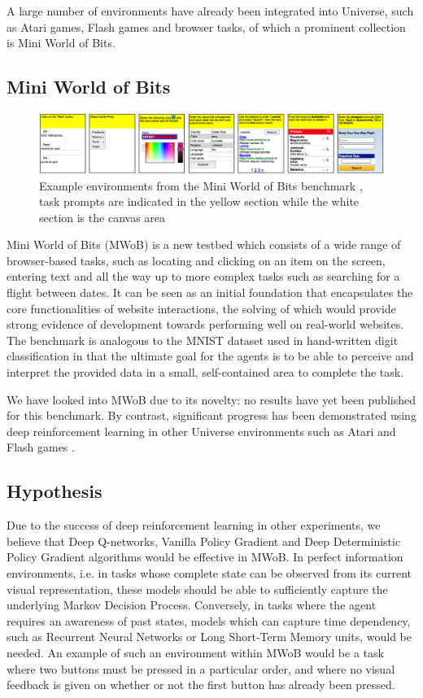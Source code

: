 \documentclass[10pt,journal,compsoc]{IEEEtran}
\begin{document}
A large number of environments have already been integrated into Universe, such as Atari games, Flash games and browser tasks, of which a prominent collection is Mini World of Bits.

\subsection{Mini World of Bits}

\begin{figure}[t]
	\includegraphics[width=\textwidth, height=\textheight, keepaspectratio]{mwob.png}
	\caption{Example environments from the Mini World of Bits benchmark \cite{mwob}, task prompts are indicated in the yellow section while the white section is the canvas area}
	\label{fig:mwob}
\end{figure}

Mini World of Bits (MWoB) \cite{mwob} is a new testbed which consists of a wide range of browser-based tasks, such as locating and clicking on an item on the screen, entering text and all the way up to more complex tasks such as searching for a flight between dates. It can be seen as an initial foundation that encapsulates the core functionalities of website interactions, the solving of which would provide strong evidence of development towards performing well on real-world websites. The benchmark is analogous to the MNIST dataset \cite{lecun1998gradient} used in hand-written digit classification in that the ultimate goal for the agents is to be able to perceive and interpret the provided data in a small, self-contained area to complete the task.

We have looked into MWoB due to its novelty: no results have yet been published for this benchmark. By contrast, significant progress has been demonstrated using deep reinforcement learning in other Universe environments such as Atari and Flash games \cite{mnih2013playing}.

\subsection{Hypothesis}
Due to the success of deep reinforcement learning in other experiments, we believe that Deep Q-networks, Vanilla Policy Gradient and Deep Deterministic Policy Gradient algorithms would be effective in MWoB. In perfect information environments, i.e. in tasks whose complete state can be observed from its current visual representation, these models should be able to sufficiently capture the underlying Markov Decision Process. Conversely, in tasks where the agent requires an awareness of past states, models which can capture time dependency, such as Recurrent Neural Networks or Long Short-Term Memory units, would be needed. An example of such an environment within MWoB would be a task where two buttons must be pressed in a particular order, and where no visual feedback is given on whether or not the first button has already been pressed.
\end{document}
